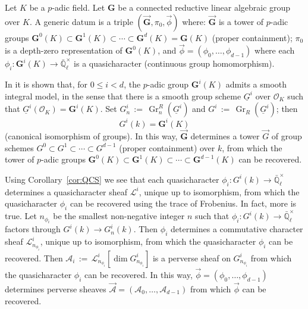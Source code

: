 \documentclass[10pt]{amsart}
\theoremstyle{plain}
\theoremstyle{definition}
\newcommand{\EE}{\mathbb{\bar Q}_\ell}
\newcommand{\OK}{\mathcal{O}_K}
\newcommand{\Fq}{k}
\newcommand{\EEx}{\EE^\times}
\newcommand{\G}{\textbf{G}}
\DeclareMathOperator{\Gr}{Gr}
\newcommand{\ceq}{{\, :=\, }}
\newcommand{\cs}[1]{{\mathcal{#1}}}
\begin{document}
Let $K$ be a $p$-adic field. Let $\G$ be a connected reductive linear algebraic group over $K$. 
A generic datum is a triple $(\vec{\G}, \pi_0, \vec{\phi})$ where: $\vec{\G}$ is a tower of $p$-adic groups $\G^0(K) \subset \G^1(K) \subset \cdots  \subset \G^d(K) = \G(K)$ (proper containment); $\pi_0$ is a depth-zero representation of $\G^0(K)$, and $\vec{\phi} = (\phi_0, \ldots , \phi_{d-1})$ where each $\phi_i : \G^i(K) \to \EEx$ is a quasicharacter (continuous group homomorphism).  


In \cite{yu:03a} it is shown that, for $0 \leq i < d$, the $p$-adic group $\G^i(K)$ admits a smooth integral model, in the sense that there is a smooth group scheme $\underline{G}^i$ over $\OK$ such that $\underline{G}^i(\OK) = \G^i(K)$.
Set $G^i_n \ceq \Gr^R_n(\underline{G}^i)$ and $G^i \ceq \Gr_R(\underline{G}^i)$; 
then \[G^i(\Fq) = \G^i(K)\] (canonical isomorphism of groups).
In this way, $\vec{\G}$ determines a tower $\vec{G}$ of group schemes $G^0 \subset G^1 \subset \cdots  \subset G^{d-1}$ (proper containment) over $\Fq$, from which the tower of $p$-adic groups
$\G^0(K) \subset \G^1(K) \subset \cdots  \subset \G^{d-1}(K)$ can be recovered.

Using Corollary~\ref{cor:QCS} we see that each quasicharacter $\phi_i : G^i(\Fq) \to \EEx$ determines a quasicharacter sheaf $\cs{L}^i$, unique up to isomorphism, from which the quasicharacter $\phi_i$ can be recovered using the trace of Frobenius. 
In fact, more is true. Let $n_{\phi_i}$ be the smallest non-negative integer $n$ such that $\phi_i : G^i(\Fq) \to \EEx$ factors through $G^i(\Fq) \to G^i_n(\Fq)$.
Then $\phi_i$ determines a commutative character sheaf $\cs{L}_{n_{\phi_i}}^i$, unique up to isomorphism, from which the quasicharacter $\phi_i$ can be recovered.
Then $\cs{A}_i\ceq \cs{L}_{n_{\phi_i}}^i[\dim G_{n_{\phi_i}}^i]$ is a perverse sheaf on $G_{n_{\phi_i}}^i$ from which the quasicharacter $\phi_i$ can be recovered.
In this way,  $\vec{\phi} = (\phi_0, \ldots , \phi_{d-1})$ determines perverse sheaves $\vec{\cs{A}} = (\cs{A}_0, \ldots , \cs{A}_{d-1})$ from which $\vec{\phi}$ can be recovered. 
\end{document}
